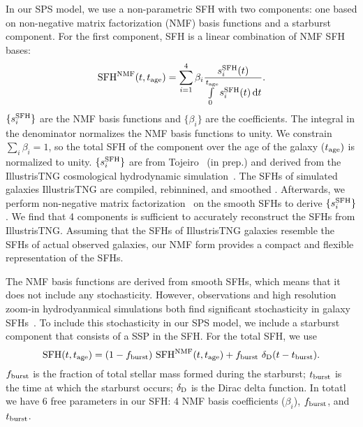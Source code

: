 In our SPS model, we use a non-parametric SFH with two components: one based on
non-negative matrix factorization (NMF) basis functions and a starburst component.
For the first component, SFH is a linear combination of NMF SFH bases:
\begin{equation} \label{eq:nmf} 
    {\rm SFH}^{\rm NMF} (t, t_{\rm age}) = \sum\limits_{i=1}^{4} \beta_i
    \frac{s_i^{\rm SFH}(t)}{\int\limits_0^{t_{\rm age}} s_i^{\rm SFH}(t) \,
    {\rm d}t}. 
\end{equation} 
$\{s^{\rm SFH}_i\}$ are the NMF basis functions and $\{\beta_i\}$ are the
coefficients. 
The integral in the denominator normalizes the NMF basis functions to unity. 
We constrain $\sum_i \beta_i = 1$, so the total SFH of the component over the
age of the galaxy ($t_{\rm age})$ is normalized to unity.
$\{s^{\rm SFH}_i\}$ are from Tojeiro \etal~(in prep.) and derived from the
IllustrisTNG cosmological hydrodynamic simulation~\citep{nelson2018,
pillepich2018, springel2018}.
The SFHs of simulated galaxies IllustrisTNG are compiled, rebinnined, and smoothed
. 
Afterwards, we perform non-negative matrix
factorization~\citep{lee1999,cichocki2009, fevotte2011} on the smooth SFHs to
derive $\{s^{\rm SFH}_i\}$. 
We find that 4 components is sufficient to accurately reconstruct the SFHs
from IllustrisTNG. 
Assuming that the SFHs of IllustrisTNG galaxies resemble the SFHs of actual
observed galaxies, our NMF form provides a compact and flexible representation
of the SFHs. 

The NMF basis functions are derived from smooth SFHs, which means that it does
not include any stochasticity. 
However, observations and high resolution zoom-in hydrodyanmical simulations
both find significant stochasticity in galaxy SFHs~\citep{sparre2017,
caplar2019, hahn2019b, iyer2020}. 
To include this stochasticity in our SPS model, we include a starburst
component that consists of a SSP in the SFH. 
For the total SFH, we use
\begin{equation} \label{eq:sfh}
    {\rm SFH} (t, t_{\rm age}) = (1 - f_{\rm burst})~{\rm SFH}^{\rm NMF} (t,
    t_{\rm age}) + f_{\rm burst}~\delta_{\rm D}(t - t_{\rm burst}).
\end{equation}
$f_{\rm burst}$ is the fraction of total stellar mass formed during the
starburst; $t_{\rm burst}$ is the time at which the starburst occurs; 
$\delta_{\rm D}$ is the Dirac delta function.
In totatl we have 6 free parameters in our SFH: 4 NMF basis coefficients 
($\beta_i$), $f_{\rm burst}$, and $t_{\rm burst}$. 

